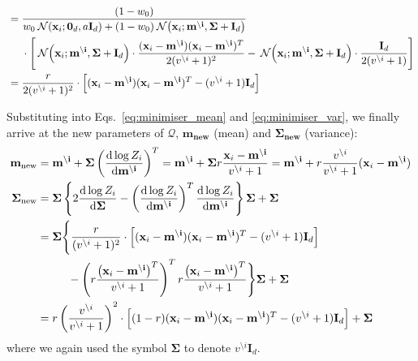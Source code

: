 \documentclass[11pt]{article}
\newcommand{\vek}[1]{\ensuremath{\mathbf{#1}}}
\newcommand{\byd}{\ensuremath{\mathrm{d}}}
\newcommand{\norm}{\ensuremath{\:\mathcal{N}}}
\newcommand{\unity}{\ensuremath{\mathbf{I}}}
\begin{document}
\begin{align}
			&=
			\frac{(1 - w_0)
				}
			{w_0  \norm(\vek{x}_i; \vek{0}_d, a\unity_{d})
			+  (1 - w_0)\norm\!\left(\vek{x}_i; \vek{m^{\setminus i}}, \vek{\Sigma} + \unity_d\right)
			}\notag\\
			&\hphantom{=|}\mbox{}\cdot\Bigg[
				\norm\!\left(\vek{x}_i; \vek{m^{\setminus i}}, \vek{\Sigma} + \unity_d\right)
				\cdot\frac{(\vek{x}_i - \vek{m^{\setminus i}})(\vek{x}_i 
				- \vek{m^{\setminus i}})^T}{2(v^{\setminus i} + 1)^2}
				- \norm\!\left(\vek{x}_i; \vek{m^{\setminus i}}, \vek{\Sigma} + \unity_d\right)
				\cdot\frac{\unity_d}{2(v^{\setminus i} + 1)}
				\Bigg]\\
			&= \frac{r}{2(v^{\setminus i} + 1)^2}\cdot\left[
				(\vek{x}_i - \vek{m^{\setminus i}})(\vek{x}_i - \vek{m^{\setminus i}})^T
				- (v^{\setminus i} + 1)\unity_d
			\right]
\end{align}

Substituting into Eqs.~\eqref{eq:minimiser_mean} and 
\eqref{eq:minimiser_var}, we finally arrive at the new parameters of 
$\mathcal{Q}$, $\vek{m_{\text{new}}}$ (mean) and 
$\vek{\Sigma_{\text{new}}}$ (variance):
\begin{align}
	 \vek{m_{\text{new}}} &= \vek{m^{\setminus i}} + \vek{\Sigma}
							\left(\frac{\byd \log Z_i}
									 {\byd \vek{m^{\setminus i}}}\right)^T
	         = \vek{m^{\setminus i}} + \vek{\Sigma}
							r\frac{\vek{x}_i - \vek{m^{\setminus i}}}
										{v^{\setminus i} + 1}
	         = \vek{m^{\setminus i}}
					 		+ r\frac{v^{\setminus i}}{v^{\setminus i} + 1}
							  (\vek{x}_i - \vek{m^{\setminus i}})
					\label{eq:mnew}
					\\
	 \vek{\Sigma_{\text{new}}} &=
		\vek{\Sigma}\left\{
		2\frac{\byd\log Z_i}{\byd \vek{\Sigma}}
			- \left(\frac{\byd\log Z_i}{\byd\vek{m^{\setminus i}}}\right)^T
				\frac{\byd\log Z_i}{\byd\vek{m^{\setminus i}}}\right\}\vek{\Sigma}
			+ \vek{\Sigma} \\
		&=
		\vek{\Sigma}\Bigg\{
			\frac{r}{(v^{\setminus i} + 1)^2}\cdot\left[
				(\vek{x}_i - \vek{m^{\setminus i}})(\vek{x}_i - \vek{m^{\setminus i}})^T
				- (v^{\setminus i} + 1)\unity_d
			\right]\notag\\
		&\hphantom{=\vek{\Sigma}\Bigg\{}\mbox{}
			- \left(r\frac{\left(\vek{x}_i - \vek{m^{\setminus i}}\right)^T}
					{v^{\setminus i} + 1}\right)^T
			r\frac{\left(\vek{x}_i - \vek{m^{\setminus i}}\right)^T}
					{v^{\setminus i} + 1}
				\Bigg\}\vek{\Sigma}
			+ \vek{\Sigma} \\
		&=
			r\left(\frac{v^{\setminus i}}{v^{\setminus i} + 1}\right)^2
			\cdot\left[
				(1 - r)(\vek{x}_i - \vek{m^{\setminus i}})(\vek{x}_i - \vek{m^{\setminus i}})^T
				- (v^{\setminus i} + 1)\unity_d
			\right]
			+ \vek{\Sigma}
			\label{eq:sigma_new}
\end{align}
where we again used the symbol $\vek{\Sigma}$ to denote $v^{\setminus 
i}\unity_d$.
\end{document}
